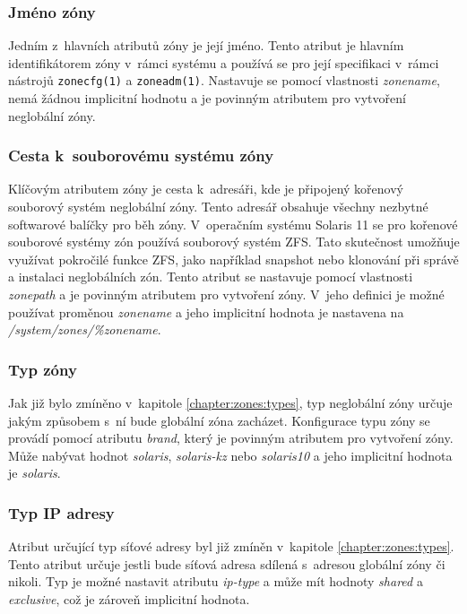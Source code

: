 \subsubsection{Jméno zóny}
\label{chapter:zones:configuration:global_attributes:zonename}
Jedním z~hlavních atributů zóny je její jméno. Tento atribut je hlavním identifikátorem zóny v~rámci systému a používá se
pro její specifikaci v~rámci nástrojů \verb|zonecfg(1)| a \verb|zoneadm(1)|. Nastavuje se pomocí vlastnosti \textit{zonename},
nemá žádnou implicitní hodnotu a je povinným atributem pro vytvoření neglobální zóny.
\subsubsection{Cesta k~souborovému systému zóny}
\label{chapter:zones:configuration:global_attributes:zonepath}
Klíčovým atributem zóny je cesta k~adresáři, kde je připojený kořenový souborový systém neglobální zóny. Tento adresář obsahuje
všechny nezbytné softwarové balíčky pro běh zóny. V~operačním systému Solaris 11 se pro kořenové souborové systémy zón používá
souborový systém ZFS. Tato skutečnost umožňuje využívat pokročilé funkce ZFS, jako například snapshot nebo klonování při správě
a instalaci neglobálních zón. Tento atribut se nastavuje pomocí vlastnosti \textit{zonepath} a je povinným atributem pro 
vytvoření zóny. V~jeho definici je možné používat proměnou \textit{zonename} a jeho implicitní hodnota je nastavena na
\textit{/system/zones/\%{zonename}}.
\subsubsection{Typ zóny}
\label{chapter:zones:configuration:global_attributes:brand}
Jak již bylo zmíněno v~kapitole \ref{chapter:zones:types}, typ neglobální zóny určuje jakým způsobem s~ní bude globální zóna zacházet.
Konfigurace typu zóny se provádí pomocí atributu \textit{brand}, který je povinným atributem pro vytvoření zóny. Může nabývat
hodnot \textit{solaris}, \textit{solaris-kz} nebo \textit{solaris10} a jeho implicitní hodnota je \textit{solaris}.
\subsubsection{Typ IP adresy}
\label{chapter:zones:configuration:global_attributes:ip-type}
Atribut určující typ síťové adresy byl již zmíněn v~kapitole \ref{chapter:zones:types}. Tento atribut určuje jestli bude síťová adresa
sdílená s~adresou globální zóny či nikoli. Typ je možné nastavit atributu \textit{ip-type} a může mít hodnoty \textit{shared} a 
\textit{exclusive}, což je zároveň implicitní hodnota.
